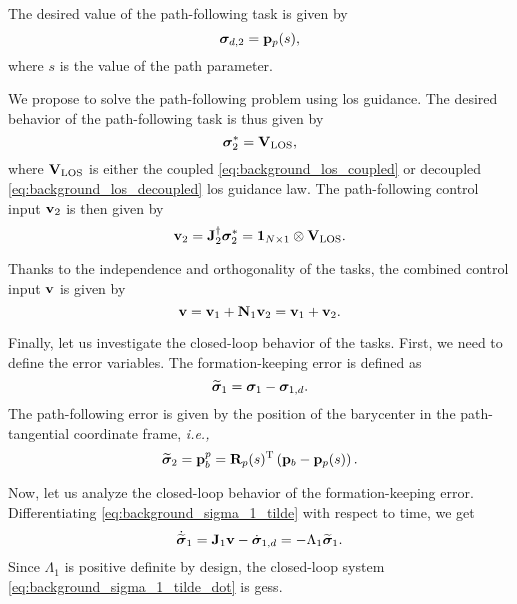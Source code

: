 The desired value of the path-following task is given by
\begin{equation}
    \bm{\sigma}_{d, 2} = \mathbf{p}_p(s),
\end{equation}
where $s$ is the value of the path parameter.

We propose to solve the path-following problem using \acrlong{los} guidance.
The desired behavior of the path-following task is thus given by
\begin{equation}
    \bm{\sigma}_2^{*} = \mathbf{V}_{\rm LOS},
\end{equation}
where $\mathbf{V}_{\rm LOS}$ is either the coupled \eqref{eq:background_los_coupled} or decoupled \eqref{eq:background_los_decoupled} \gls{los} guidance law.
The path-following control input $\mathbf{v}_2$ is then given by
\begin{equation}
    \mathbf{v}_2 = \mathbf{J}_2^{\dagger} \bm{\sigma}_2^{*} = \mathbf{1}_{N \times 1} \otimes \mathbf{V}_{\rm LOS}.
\end{equation}

Thanks to the independence and orthogonality of the tasks, the combined control input $\mathbf{v}$ is given by
\begin{equation}
    \mathbf{v} = \mathbf{v}_1 + \mathbf{N}_1 \mathbf{v}_2 = \mathbf{v}_1 + \mathbf{v}_2.
\end{equation}

Finally, let us investigate the closed-loop behavior of the tasks.
First, we need to define the error variables.
The formation-keeping error is defined as
\begin{equation}
    \widetilde{\bm{\sigma}}_1 = \bm{\sigma}_1 - \bm{\sigma}_{1, d}.
    \label{eq:background_sigma_1_tilde}
\end{equation}
The path-following error is given by the position of the barycenter in the path-tangential coordinate frame, \emph{i.e.,}
\begin{equation}
    \widetilde{\bm{\sigma}}_2 = \mathbf{p}_b^p = \mathbf{R}_p(s)^{\mathrm{T}} \left(\mathbf{p}_b - \mathbf{p}_p(s)\right).
    \label{eq:background_sigma_2_tilde}
\end{equation}

Now, let us analyze the closed-loop behavior of the formation-keeping error.
Differentiating \eqref{eq:background_sigma_1_tilde} with respect to time, we get
\begin{equation}
    \dot{\widetilde{\bm{\sigma}}}_1 = \mathbf{J}_1 \mathbf{v} - \dot{\bm{\sigma}}_{1, d} = - \Lambda_1 \widetilde{\bm{\sigma}}_1.
    \label{eq:background_sigma_1_tilde_dot}
\end{equation}
Since $\Lambda_1$ is positive definite by design, the closed-loop system \eqref{eq:background_sigma_1_tilde_dot} is \glspl{ges}.

